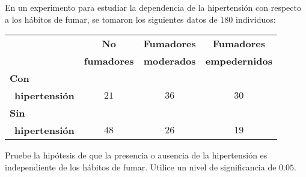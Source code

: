 \begin{enunciado}
 En un experimento para estudiar la dependencia de la hipertensi\'on
 con respecto a los h\'abitos de fumar, se tomaron los siguientes datos
 de $180$ individuos:
 \begin{center}
  \begin{tabular}{lccc}
   & \textbf{No} & \textbf{Fumadores} & \textbf{Fumadores} \\
   & \textbf{fumadores} & \textbf{moderados} & \textbf{empedernidos} \\
   \hline 
   \textbf{Con} \\
   $\,$ \textbf{hipertensi\'on} & $21$ & $36$ & $30$ \\
   \textbf{Sin} \\
   $\,$ \textbf{hipertensi\'on} & $48$ & $26$ & $19$
  \end{tabular}
 \end{center}
 Pruebe la hip\'otesis de que la presencia o ausencia de la hipertensi\'on es
 independiente de los h\'abitos de fumar.
 Utilice un nivel de significancia de $0.05$.
\end{enunciado}

